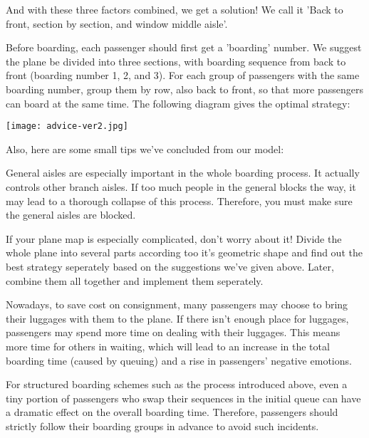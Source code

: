 \begin{itemize}
		And with these three factors combined, we get a solution! We call it 'Back to front, section by section, and window middle aisle'.

		Before boarding, each passenger should first get a 'boarding' number. We suggest the plane be divided into three sections, with boarding sequence from back to front (boarding number 1, 2, and 3). For each group of passengers with the same boarding number, group them by row, also back to front, so that more passengers can board at the same time. The following diagram gives the optimal strategy:
		\begin{center}
			\texttt{[image: advice-ver2.jpg]}
		\end{center}
	\end{itemize}

	Also, here are some small tips we've concluded from our model:
	\begin{enumerate}

		General aisles are especially important in the whole boarding process. It actually controls other branch aisles. If too much people in the general blocks the way, it may lead to a thorough collapse of this process. Therefore, you must make sure the general aisles are blocked.

		If your plane map is especially complicated, don't worry about it! Divide the whole plane into several parts according too it's geometric shape and find out the best strategy seperately based on the suggestions we've given above. Later, combine them all together and implement them seperately.

		Nowadays, to save cost on consignment, many passengers may choose to bring their luggages with them to the plane. If there isn't enough place for luggages, passengers may spend more time on dealing with their luggages. This means more time for others in waiting, which will lead to an increase in the total boarding time (caused by queuing) and a rise in passengers' negative emotions.


		For structured boarding schemes such as the process introduced above, even a tiny portion of passengers who swap their sequences in the initial queue can have a dramatic effect on the overall boarding time. Therefore, passengers should strictly follow their boarding groups in advance to avoid such incidents.
	\end{enumerate}

